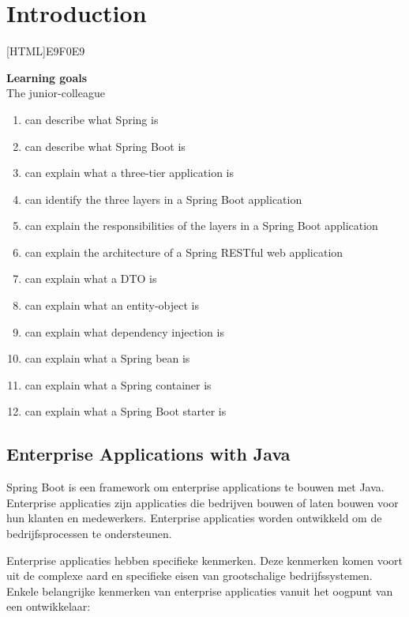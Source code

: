 \chapter{Introduction}
    
[HTML]{E9F0E9}{\parbox{\textwidth}{%
\noindent \textbf{Learning goals}\\
The junior-colleague
\begin{enumerate}[nolistsep]
\item can describe what Spring is
\item can describe what Spring Boot is
\item can explain what a three-tier application is
\item can identify the three layers in a Spring Boot application
\item can explain the responsibilities of the layers in a Spring Boot application
\item can explain the architecture of a Spring RESTful web application
\item can explain what a DTO is
\item can explain what an entity-object is
\item can explain what dependency injection is
\item can explain what a Spring bean is
\item can explain what a Spring container is
\item can explain what a Spring Boot starter is
\end{enumerate}}}


\section{Enterprise Applications with Java}

Spring Boot is een framework om enterprise applications te bouwen met Java.
Enterprise applicaties zijn applicaties die bedrijven bouwen of laten bouwen voor hun klanten en medewerkers.  Enterprise applicaties worden ontwikkeld om de bedrijfsprocessen te ondersteunen. 

Enterprise applicaties hebben specifieke kenmerken. Deze kenmerken komen voort uit de complexe aard en specifieke eisen van grootschalige bedrijfssystemen.  Enkele belangrijke kenmerken van enterprise applicaties vanuit het oogpunt van een ontwikkelaar:

